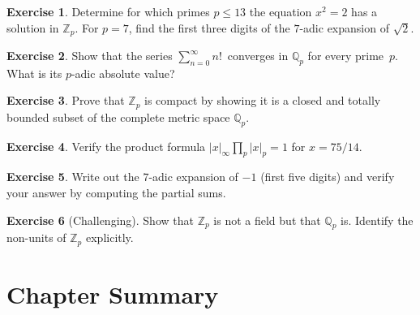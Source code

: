 \documentclass[12pt,a4paper,openany]{book}
\theoremstyle{definition}
\newtheorem{exercise}{Exercise}[chapter]
\theoremstyle{plain}
\theoremstyle{remark}
\newcommand{\Z}{\mathbb{Z}}
\newcommand{\Q}{\mathbb{Q}}
\newcommand{\abs}[1]{\left|#1\right|}
\begin{document}
\begin{exercise}
\label{exer:hensel-sqrt2}
Determine for which primes $p \leq 13$ the equation $x^2 = 2$ has a solution
in $\Z_p$. For $p=7$, find the first three digits of the $7$-adic expansion
of $\sqrt{2}$.
\end{exercise}

\begin{exercise}
\label{exer:p-adic-series}
Show that the series $\sum_{n=0}^{\infty} n!\,$ converges in $\Q_p$ for every
prime~$p$. What is its $p$-adic absolute value?
\end{exercise}

\begin{exercise}
\label{exer:Zp-compact}
Prove that $\Z_p$ is compact by showing it is a closed and totally bounded
subset of the complete metric space $\Q_p$.
\end{exercise}

\begin{exercise}
\label{exer:product-formula-verify}
Verify the product formula $\abs{x}_\infty \prod_p \abs{x}_p = 1$ for
$x = 75/14$.
\end{exercise}

\begin{exercise}
\label{exer:minus-one-expansion}
Write out the $7$-adic expansion of $-1$ (first five digits) and verify your
answer by computing the partial sums.
\end{exercise}

\begin{exercise}[Challenging]
\label{exer:Zp-not-field}
Show that $\Z_p$ is not a field but that $\Q_p$ is. Identify the non-units of
$\Z_p$ explicitly.
\end{exercise}

\section{Chapter Summary}
\label{sec:p-adic-summary}
\end{document}
